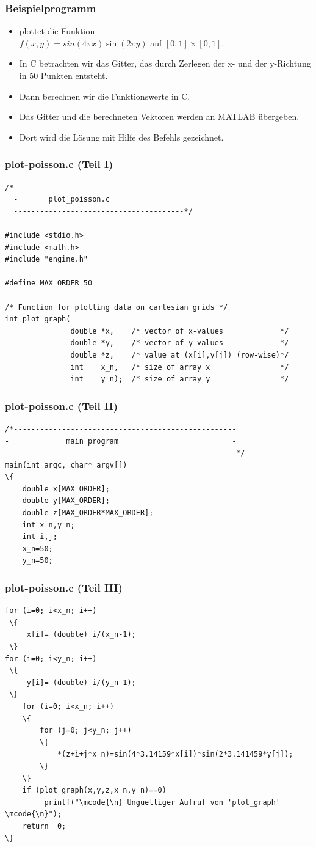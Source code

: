 %
%
\begin{frame}[fragile]\frametitle{Beispielprogramm}
\begin{itemize}
\item {} plottet die Funktion\\
$f(x,y)= sin(4 \pi x) \sin (2 \pi y)$
auf $[0,1] \times [0,1]$.
\item In C betrachten wir das Gitter, das durch Zerlegen der x- und der
y-Richtung in 50 Punkten entsteht. 
\item Dann berechnen wir die Funktionswerte in C.
\item Das Gitter und die berechneten Vektoren werden an MATLAB \"ubergeben.
\item Dort wird die L\"osung mit Hilfe des Befehls  gezeichnet.
\end{itemize}
\end{frame}
%
%
\begin{frame}[fragile]\frametitle{plot-poisson.c (Teil I)}
\begin{lstlisting}
/*-----------------------------------------
  -       plot_poisson.c
  ---------------------------------------*/

#include <stdio.h>
#include <math.h>
#include "engine.h"

#define MAX_ORDER 50

/* Function for plotting data on cartesian grids */
int plot_graph(
               double *x,    /* vector of x-values             */
               double *y,    /* vector of y-values             */
               double *z,    /* value at (x[i],y[j]) (row-wise)*/
               int    x_n,   /* size of array x                */
               int    y_n);  /* size of array y                */
\end{lstlisting}
\end{frame}
%
%
\begin{frame}[fragile]\frametitle{plot-poisson.c (Teil II)}
\begin{lstlisting}
/*---------------------------------------------------
-             main program                          -     
-----------------------------------------------------*/
main(int argc, char* argv[]) 
\{
    double x[MAX_ORDER];
    double y[MAX_ORDER];
    double z[MAX_ORDER*MAX_ORDER];
    int x_n,y_n;
    int i,j;        
    x_n=50;
    y_n=50;
\end{lstlisting}
\end{frame}
%
%
\begin{frame}[fragile]\frametitle{plot-poisson.c (Teil III)}
\begin{lstlisting}  
for (i=0; i<x_n; i++)
 \{
     x[i]= (double) i/(x_n-1);
 \}
for (i=0; i<y_n; i++)
 \{
     y[i]= (double) i/(y_n-1);
 \}
    for (i=0; i<x_n; i++) 
    \{
        for (j=0; j<y_n; j++)
        \{
            *(z+i+j*x_n)=sin(4*3.14159*x[i])*sin(2*3.141459*y[j]);
        \}
    \}      
    if (plot_graph(x,y,z,x_n,y_n)==0)  
         printf("\mcode{\n} Ungueltiger Aufruf von 'plot_graph' \mcode{\n}");
    return  0;
\}
\end{lstlisting}
\end{frame}
